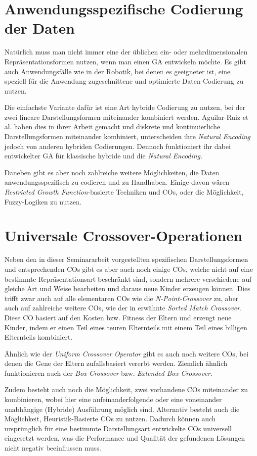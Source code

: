 \section{Anwendungsspezifische Codierung der Daten}
\label{sec:AnwSpezCod}

	Natürlich muss man nicht immer eine der üblichen ein- oder mehrdimensionalen Repräsentationsformen nutzen, wenn man einen GA entwickeln möchte. Es gibt auch Anwendungsfälle wie \zB in der Robotik, \cite{GABook} bei denen es geeigneter ist, eine speziell für die Anwendung zugeschnittene und optimierte Daten-Codierung zu nutzen.
	
	Die einfachste Variante dafür ist eine Art hybride Codierung zu nutzen, bei der zwei lineare Darstellungsformen miteinander kombiniert werden. Aguilar-Ruiz et al. haben dies in ihrer Arbeit \cite{NaturalCoding} gemacht und diskrete und kontinuierliche Darstellungsformen miteinander kombiniert, unterscheiden ihre \textit{Natural Encoding} jedoch von anderen hybriden Codierungen. Dennoch funktioniert ihr dabei entwickelter GA für klassische hybride und die \textit{Natural Encoding}.
	
	Daneben gibt es aber noch zahlreiche weitere Möglichkeiten, die Daten anwendungsspezifisch zu codieren und zu Handhaben. Einige davon wären \zB \textit{Restricted Growth Function}-basierte Techniken und COs, \cite{RestrictedGrowthFunction} oder die Mög\-lich\-keit, Fuzzy-Logiken zu nutzen. \cite{FuzzyEncoding}

\section{Universale Crossover-Operationen}
\label{sec:UnivOp}

	Neben den in dieser Seminararbeit vorgestellten spezifischen Darstellungsformen und entsprechenden COs gibt es aber auch noch einige COs, welche nicht auf eine bestimmte Repräsentationsart beschränkt sind, sondern mehrere verschiedene auf gleiche Art und Weise bearbeiten und daraus neue Kinder erzeugen können. Dies trifft zwar auch auf alle elementaren COs wie die \textit{N-Point-Crossover} zu, aber auch auf zahlreiche weitere COs, wie \zB der in \cite{COforPermutations} erwähnte \textit{Sorted Match Crossover}. Diese CO basiert auf den Kosten bzw. Fitness der Eltern und erzeugt neue Kinder, indem er einen Teil eines teuren Elternteils mit einem Teil eines billigen Elternteils kombiniert.
	
	Ähnlich wie der \textit{Uniform Crossover Operator} gibt es auch noch weitere COs, bei denen die Gene der Eltern zufallsbasiert vererbt werden. Ziemlich ähnlich funktionieren auch der \textit{Box Crossover} bzw. \textit{Extended Box Crossover}. \cite{BoxCrossover}
	
	Zudem besteht auch noch die Möglichkeit, zwei vorhandene COs miteinander zu kombinieren, wobei hier eine aufeinanderfolgende oder eine voneinander unabhängige (Hybride) Ausführung möglich sind. Alternativ besteht auch die Möglichkeit, Heuristik-Basierte COs zu nutzen. Dadurch können auch ursprünglich für eine bestimmte Darstellungsart entwickelte COs universell eingesetzt werden, was die Performance und Qualität der gefundenen Lösungen nicht negativ beeinflussen muss.
